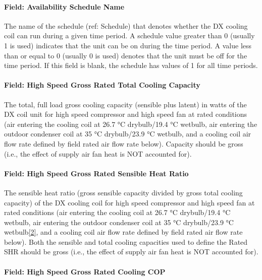 \paragraph{Field: Availability Schedule Name}\label{field-availability-schedule-name-7-001}

The name of the schedule (ref: Schedule) that denotes whether the DX cooling coil can run during a given time period. A schedule value greater than 0 (usually 1 is used) indicates that the unit can be on during the time period. A value less than or equal to 0 (usually 0 is used) denotes that the unit must be off for the time period. If this field is blank, the schedule has values of 1 for all time periods.

\paragraph{Field: High Speed Gross Rated Total Cooling Capacity}\label{field-high-speed-gross-rated-total-cooling-capacity}

The total, full load gross cooling capacity (sensible plus latent) in watts of the DX coil unit for high speed compressor and high speed fan at rated conditions (air entering the cooling coil at 26.7 °C drybulb/19.4 °C wetbulb, air entering the outdoor condenser coil at 35 °C drybulb/23.9 °C wetbulb, and a cooling coil air flow rate defined by field rated air flow rate below). Capacity should be gross (i.e., the effect of supply air fan heat is NOT accounted for).

\paragraph{Field: High Speed Gross Rated Sensible Heat Ratio}\label{field-high-speed-gross-rated-sensible-heat-ratio}

The sensible heat ratio (gross sensible capacity divided by gross total cooling capacity) of the DX cooling coil for high speed compressor and high speed fan at rated conditions (air entering the cooling coil at 26.7 °C drybulb/19.4 °C wetbulb, air entering the outdoor condenser coil at 35 °C drybulb/23.9 °C wetbulb\protect\hyperlink{ux5fftn2}{{[}2{]}}, and a cooling coil air flow rate defined by field rated air flow rate below). Both the sensible and total cooling capacities used to define the Rated SHR should be gross (i.e., the effect of supply air fan heat is NOT accounted for).

\paragraph{Field: High Speed Gross Rated Cooling COP}\label{field-high-speed-gross-rated-cooling-cop}

